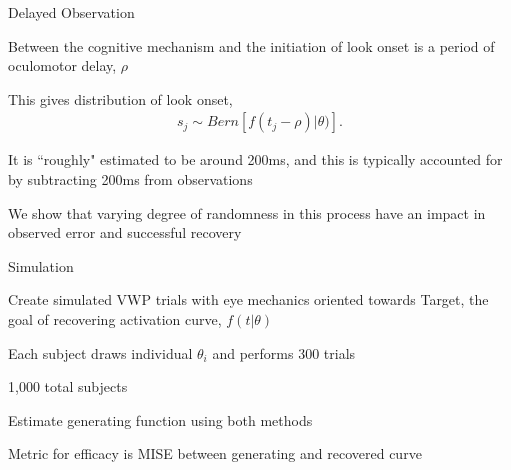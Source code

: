 \documentclass{beamer}
\begin{document}
\begin{frame}{Delayed Observation}\large

Between the cognitive mechanism and the initiation of look onset is a period of oculomotor delay, $\rho$ \vspace{4mm}

This gives distribution of look onset,
\vspace{-1mm}
\begin{align*}
s_j \sim Bern \left[f(t_j - \rho) | \theta)\right].
\end{align*}

It is ``roughly" estimated to be around 200ms, and this is typically accounted for by subtracting 200ms from observations \vspace{4mm}

We show that varying degree of randomness in this process have an impact in observed error and successful recovery



\end{frame}



\begin{frame}{Simulation}\large

Create simulated VWP trials with eye mechanics oriented towards Target, the goal of recovering activation curve, $f(t|\theta)$ \vspace{4mm}

Each subject draws individual $\theta_i$ and performs 300 trials \vspace{4mm}

 1,000 total subjects \vspace{4mm}

Estimate generating function using both  methods \vspace{4mm}

Metric for efficacy is MISE between generating and recovered curve
\end{frame}
\end{document}
